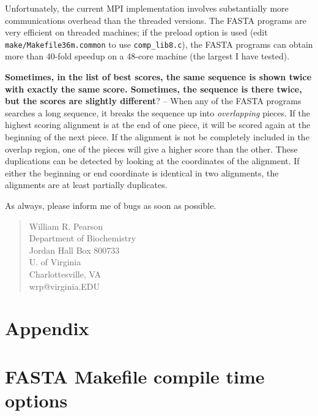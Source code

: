 \documentclass[11pt]{article}
\begin{document}
Unfortunately, the current MPI implementation involves substantially
more communications overhead than the threaded versions.  The FASTA
programs are very efficient on threaded machines; if the preload
option is used (edit \texttt{make/Makefile36m.common} to use
\texttt{comp\_lib8.c}), the FASTA programs can obtain more than 40-fold speedup on a 48-core machine (the largest I have tested). 

\vspace{0.5ex}
{\noindent}\textbf{Sometimes, in the list of best scores, the same sequence is
  shown twice with exactly the same score.  Sometimes, the sequence is
  there twice, but the scores are slightly different}? -- When any of
the FASTA programs searches a long sequence, it breaks the sequence up
into \emph{overlapping} pieces.  If the highest scoring alignment is
at the end of one piece, it will be scored again at the beginning of
the next piece.  If the alignment is not be completely included in the
overlap region, one of the pieces will give a higher score than the
other.  These duplications can be detected by looking at the
coordinates of the alignment.  If either the beginning or end
coordinate is identical in two alignments, the alignments are at least
partially duplicates.

\vspace{2ex}
As always, please inform me of bugs as soon as possible.

\begin{quote}
William R. Pearson\\
Department of Biochemistry\\
Jordan Hall Box 800733\\
U. of Virginia\\
Charlottesville, VA\\
wrp@virginia.EDU
\end{quote}




\appendix
\section*{Appendix}

\section{FASTA Makefile compile time options}
\end{document}
